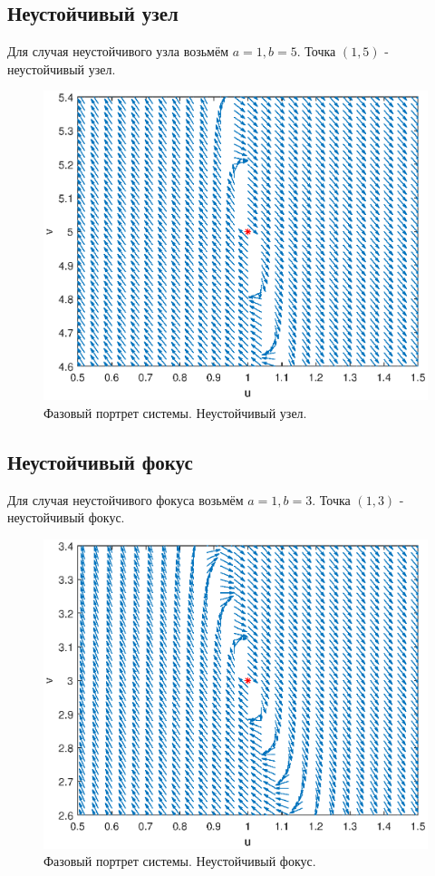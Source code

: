 \documentclass[12pt]{article}
\begin{document}
\subsection{Неустойчивый узел}
    Для случая неустойчивого узла возьмём $a = 1, b = 5$. Точка $\left(1, 5\right)$ - неустойчивый узел.
    \begin{figure} [H]
        \begin{center}
        \includegraphics[width=1\textwidth]{phaseport1.eps}
        \caption{Фазовый портрет системы. Неустойчивый узел.}
        \label{pic2}
        \end{center}
    \end{figure}
\newpage
\subsection{Неустойчивый фокус}
    Для случая неустойчивого фокуса возьмём $a = 1, b = 3$. Точка $\left(1, 3\right)$ - неустойчивый фокус.
    \begin{figure} [H]
        \begin{center}
        \includegraphics[width=1\textwidth]{phaseport2.eps}
        \caption{Фазовый портрет системы. Неустойчивый фокус.}
        \label{pic3}
        \end{center}
    \end{figure}
\newpage
\end{document}
